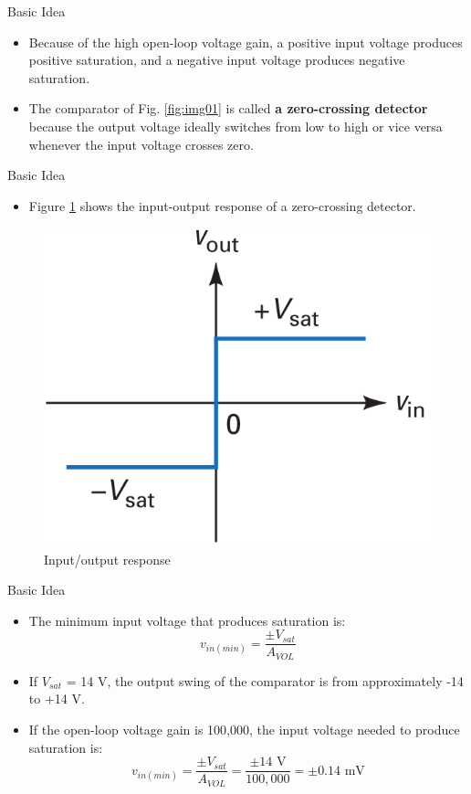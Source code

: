 \documentclass[pdflatex,compress]{beamer}
\begin{document}
\begin{frame}{Basic Idea}
	\begin{itemize}
		\item Because of the high open-loop voltage gain, a positive input voltage produces positive saturation, and a negative input voltage produces negative saturation.
		\item The comparator of Fig. \ref{fig:img01} is called \textbf{a zero-crossing detector} because the output voltage ideally switches from low to high or vice versa whenever the input voltage crosses zero.
	\end{itemize}
\end{frame}

\begin{frame}{Basic Idea}
	\begin{multicols}{2}
		\begin{itemize}
			\item Figure \ref{fig:img02} shows the input-output response of a
			zero-crossing detector.
		\end{itemize}
		\columnbreak
		\begin{figure}
			\centering
			\includegraphics[width=0.7\linewidth]{img/img02}
			\caption{Input/output response}
			\label{fig:img02}
		\end{figure}
	\end{multicols}
\end{frame}

\begin{frame}{Basic Idea}
	\begin{itemize}
		\item The minimum input voltage that produces saturation is:
		\begin{equation}\label{eq:01}
			v_{in(min)} = \frac{\pm V_{sat}}{A_{VOL}}
		\end{equation}
		\item If $V_{sat}$ = 14 V, the output swing of the comparator is from approximately -14 to +14 V.
		\item If the open-loop voltage gain is 100,000, the input voltage needed to produce saturation is:
		\begin{equation*}
			v_{in(min)} = \frac{\pm V_{sat}}{A_{VOL}} = \frac{\pm 14 \text{ V}}{100,000} = \pm 0.14 \text{ mV}
		\end{equation*}
	\end{itemize}
\end{frame}
\end{document}

